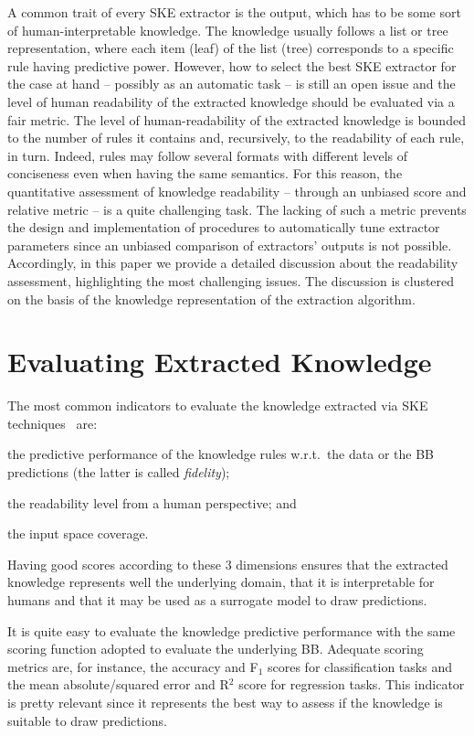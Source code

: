 \documentclass[sigconf]{acmart}
\begin{document}
A common trait of every SKE extractor is the output, which has to be some sort of human-interpretable knowledge.
%
The knowledge usually follows a list or tree representation, where each item (leaf) of the list (tree) corresponds to a specific rule having predictive power.
%
However, how to select the best SKE extractor for the case at hand -- possibly as an automatic task -- is still an open issue and the level of human readability of the extracted knowledge should be evaluated via a fair metric.
%
The level of human-readability of the extracted knowledge is bounded to the number of rules it contains and, recursively, to the readability of each rule, in turn.
%
Indeed, rules may follow several formats with different levels of conciseness even when having the same semantics.
%
For this reason, the quantitative assessment of knowledge readability -- through an unbiased score and relative metric -- is a quite challenging task.
%
The lacking of such a metric prevents the design and implementation of procedures to automatically tune extractor parameters since an unbiased comparison of extractors' outputs is not possible.
%
Accordingly, in this paper we provide a detailed discussion about the readability assessment, highlighting the most challenging issues. The discussion is clustered on the basis of the knowledge representation of the extraction algorithm.

\section{Evaluating Extracted Knowledge}

The most common indicators to evaluate the knowledge extracted via SKE techniques~\cite{garcez2001symbolic,tran2013knowledge} are:
%
\begin{inlinelist}
	\item the predictive performance of the knowledge rules w.r.t.\ the data or the BB predictions (the latter is called \emph{fidelity});
	\item the readability level from a human perspective; and
	\item the input space coverage.
\end{inlinelist}
%
Having good scores according to these 3 dimensions ensures that the extracted knowledge represents well the underlying domain, that it is interpretable for humans and that it may be used as a surrogate model to draw predictions. 

It is quite easy to evaluate the knowledge predictive performance with the same scoring function adopted to evaluate the underlying BB.
%
Adequate scoring metrics are, for instance, the accuracy and F$_1$ scores for classification tasks and the mean absolute/squared error and R$^2$ score for regression tasks.
%
This indicator is pretty relevant since it represents the best way to assess if the knowledge is suitable to draw predictions.
\end{document}
